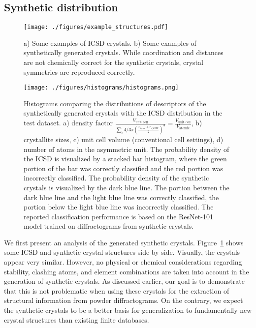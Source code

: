     \subsection{Synthetic distribution} \label{sec:synth_distribution}

    \begin{figure}[!htb]
    \centering
    \texttt{[image: ./figures/example\_structures.pdf]}
    \caption{a) Some  examples of ICSD crystals. b) Some  examples of synthetically generated crystals. While coordination and
    distances are not chemically correct for the synthetic crystals, crystal
    symmetries are reproduced correctly.}
    \label{fig:example_structures}
    \end{figure}

    \begin{figure}[!htb]
    \centering
    \texttt{[image: ./figures/histograms/histograms.png]} 
    \caption{Histograms comparing the distributions of descriptors of the
    synthetically generated crystals with the ICSD distribution in the test
    dataset. a) density factor $ \frac{V_\text{unit cell}}{\sum_i 4/3 \pi
    \left(\frac{r_{i\text{;cov}} + r_{i\text{;VdW}}}{2}\right)^3} =
    \frac{V_\text{unit cell}}{V_\text{atomic}}$, b) crystallite sizes, c) unit cell
    volume (conventional cell settings), d) number of atoms in the asymmetric
    unit. The probability density of the ICSD is visualized by a stacked bar
    histogram, where the green portion of the bar was correctly classified and
    the red portion was incorrectly classified. The probability density of the
    synthetic crystals is visualized by the dark blue line. The portion between the
    dark blue line and the light blue line was correctly classified, the portion below the
    light blue line was incorrectly classified. The reported classification
    performance is based on the ResNet-101 model trained on diffractograms from
    synthetic crystals.}
    \label{fig:histograms}
    \end{figure}

    We first present an analysis of the generated synthetic crystals.
    Figure~\ref{fig:example_structures} shows some  ICSD and
    synthetic crystal structures side-by-side. Visually, the crystals appear very
    similar. However, no physical or chemical considerations regarding stability, clashing atoms, and element combinations are taken into account in the generation of synthetic crystals. As discussed earlier, our goal is to demonstrate that this is
    not problematic when using these crystals for the extraction of structural
    information from powder diffractograms. On the contrary, we expect the synthetic crystals to be a better basis for generalization to fundamentally new crystal structures than existing finite databases.


